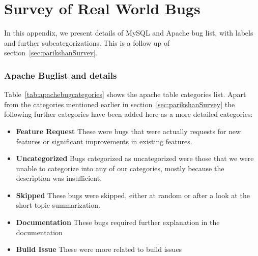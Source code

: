 \chapter{Survey of Real World Bugs}
\label{sec:appendix_survey}

In this appendix, we present details of MySQL and Apache bug list, with labels and further subcategorizations. This is a follow up of section~\ref{sec:parikshanSurvey}.

\subsection{Apache Buglist and details}
\label{sec:apachebugs}


Table~\ref{tab:apachebugcategories} shows the apache table categories list. Apart from the categories mentioned earlier in section~\ref{sec:parikshanSurvey} the following further categories have been added here as a more detailed categories:

\begin{itemize}
	\item \textbf{Feature Request} These were bugs that were actually requests for new features or significant improvements in existing features.
	
	\item \textbf{Uncategorized} Bugs categorized as uncategorized were those that we were unable to categorize into any of our categories, mostly because the description was insufficient.
	
	\item \textbf{Skipped} These bugs were skipped, either at random or after a look at the short topic summarization.
	
	\item \textbf{Documentation} These bugs required further explanation in the documentation
	
	\item \textbf{Build Issue} These were more related to build issues
	
\end{itemize}

